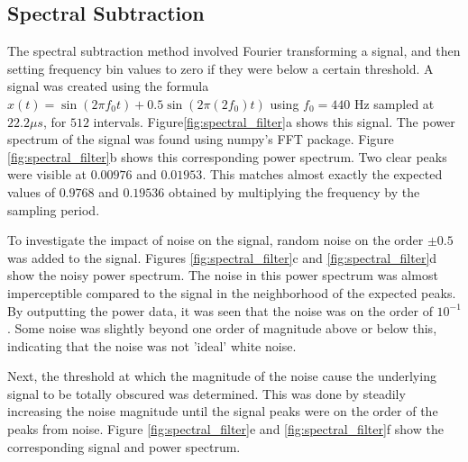 \documentclass[twocolumn]{article}
\begin{document}
\subsection{Spectral Subtraction}
The spectral subtraction method involved Fourier transforming a signal, and then setting frequency bin values to zero if they were below a certain threshold. A signal was created using the formula $ x(t) = \sin (2\pi f_0t) + 0.5\sin (2\pi (2f_0)t)$ using $f_0=440$ Hz sampled at $22.2\mu s$, for $512$ intervals. Figure\ref{fig:spectral_filter}a shows this signal. The power spectrum of the signal was found using numpy's FFT package. Figure \ref{fig:spectral_filter}b shows this corresponding power spectrum. Two clear peaks were visible at $0.00976$ and $0.01953$. This matches almost exactly the expected values of $0.9768$ and $0.19536$ obtained by multiplying the frequency by the sampling period.

To investigate the impact of noise on the signal, random noise on the order $\pm 0.5$ was added to the signal. Figures \ref{fig:spectral_filter}c and \ref{fig:spectral_filter}d show the noisy power spectrum. The noise in this power spectrum was almost imperceptible compared to the signal in the neighborhood of the expected peaks. By outputting the power data, it was seen that the noise was on the order of $10^{-1}$. Some noise was slightly beyond one order of magnitude above or below this, indicating that the noise was not 'ideal' white noise.

Next, the threshold at which the magnitude of the noise cause the underlying signal to be totally obscured was determined. This was done by steadily increasing the noise magnitude until the signal peaks were on the order of the peaks from noise. Figure \ref{fig:spectral_filter}e and \ref{fig:spectral_filter}f show the corresponding signal and power spectrum.
\end{document}
